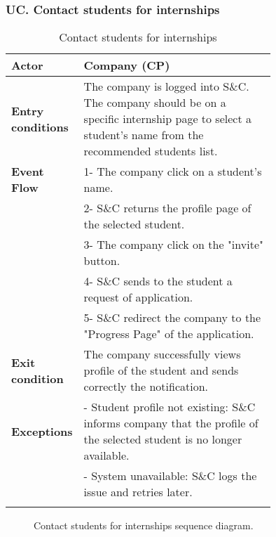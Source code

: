 \subsubsection*{UC\cuc . Contact students for internships}
\begin{center}
    \begin{longtable}{|l|p{0.75\linewidth}|}
        \hline
        \textbf{Actor}            & Company (CP)\\
        \hline
        \textbf{Entry conditions} & The company is logged into S\&C. The company should be on a specific internship page to select a student’s name from the recommended students list.\\
        \hline
        \textbf{Event Flow}     & 1- The company click on a student's name. \\
                                & 2- S\&C returns the profile page of the selected student. \\
                                & 3- The company click on the "invite" button. \\
                                & 4- S\&C sends to the student a request of application.\\
                                & 5- S\&C redirect the company to the "Progress Page" of the application.\\
        \hline
        \textbf{Exit condition}     & The company successfully views profile of                                the student and sends correctly the notification.\\       
        \hline
        \textbf{Exceptions}     & - Student profile not existing: S\&C informs company that the profile of the selected student is no longer available. \\
                                & - System unavailable: S\&C logs the issue and retries later. \\
        \hline
        \caption{Contact students for internships}
        \label{tab: contact_students_for_internships_usecase}
    \end{longtable}
\end{center}

\begin{figure}[H]
    \begin{center}
        
        \caption{Contact students for internships sequence diagram.}
        \label{fig:contact_students_for_internships_seqd}%
    \end{center}
\end{figure}

